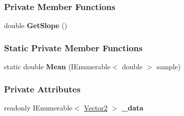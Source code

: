 \subsubsection*{Private Member Functions}
\begin{DoxyCompactItemize}
\item 
\mbox{\label{classDataTools_1_1regression_1_1LinearRegression_ad2d3a07954def16ea400c5e5fe7bf68d}} 
double {\bfseries Get\+Slope} ()
\end{DoxyCompactItemize}
\subsubsection*{Static Private Member Functions}
\begin{DoxyCompactItemize}
\item 
\mbox{\label{classDataTools_1_1regression_1_1LinearRegression_a9212d64322a1ef75bbdeb8d738dfe0f7}} 
static double {\bfseries Mean} (I\+Enumerable$<$ double $>$ sample)
\end{DoxyCompactItemize}
\subsubsection*{Private Attributes}
\begin{DoxyCompactItemize}
\item 
\mbox{\label{classDataTools_1_1regression_1_1LinearRegression_a4a9bc5e2374fd11752391a421a49a5d7}} 
readonly I\+Enumerable$<$ \hyperlink{classDataTools_1_1Vector2}{Vector2} $>$ {\bfseries \+\_\+data}
\end{DoxyCompactItemize}
